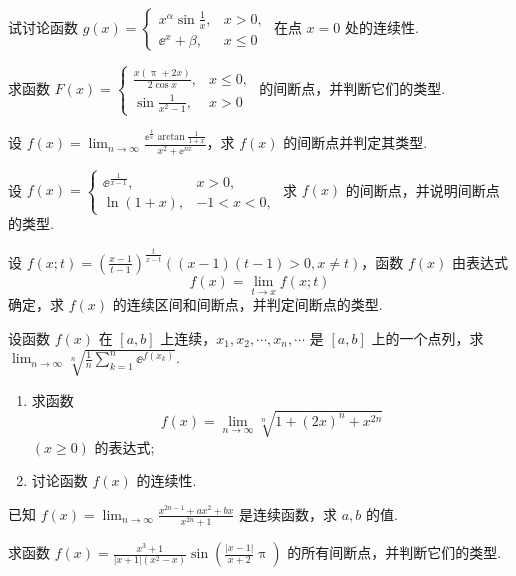 	\begin{ti}
		试讨论函数 $g(x) = \begin{cases}
			x^{\alpha} \sin\frac{1}{x}, & x > 0,\\
			\ee^{x} + \beta, & x \leq 0
		\end{cases}$ 在点 $x = 0$ 处的连续性.
	\end{ti}

	\begin{ti}
		求函数 $F(x) = \begin{cases}
			\frac{x(\uppi + 2x)}{2 \cos x}, & x \leq 0,\\
			\sin\frac{1}{x^{2} - 1}, & x > 0
		\end{cases}$ 的间断点，并判断它们的类型.
	\end{ti}

	\begin{ti}
		设 $f(x) = \lim_{n \to \infty}\frac{\ee^{\frac{1}{x}} \arctan\frac{1}{1 + x}}{x^{2} + \ee^{nx}}$，求 $f(x)$ 的间断点并判定其类型.
	\end{ti}

	\begin{ti}
		设 $f(x) = \begin{cases}
			\ee^{\frac{1}{x - 1}}, & x > 0,\\
			\ln(1 + x), & -1 < x < 0,
		\end{cases}$ 求 $f(x)$ 的间断点，并说明间断点的类型.
	\end{ti}

	\begin{ti}
		设 $f(x;t) = \left( \frac{x - 1}{t - 1} \right)^{\frac{t}{x - t}}((x - 1)(t - 1)>0, x \ne t)$，函数 $f(x)$ 由表达式
		\[
			f(x) = \lim_{t \to x}f(x;t)
		\]
		确定，求 $f(x)$ 的连续区间和间断点，并判定间断点的类型.
	\end{ti}

	\begin{ti}
		设函数 $f(x)$ 在 $[a,b]$ 上连续，$x_{1},x_{2},\cdots,x_{n},\cdots$ 是 $[a,b]$ 上的一个点列，求 $\lim_{n \to \infty} \sqrt[n]{\frac{1}{n}\sum_{k=1}^{n}\ee^{f(x_{k})}}$.
	\end{ti}

	\begin{ti}
		\begin{enumerate}
			\item 求函数 \[f(x) = \lim_{n \to \infty} \sqrt[n]{1 + (2x)^{n} + x^{2n}}\] $(x \geq 0)$ 的表达式;
			\item 讨论函数 $f(x)$ 的连续性.
		\end{enumerate}
	\end{ti}

	\begin{ti}
		已知 $f(x) = \lim_{n \to \infty} \frac{x^{2n-1} + ax^{2} + bx}{x^{2n} + 1}$ 是连续函数，求 $a,b$ 的值.
	\end{ti}

	\begin{ti}
		求函数 $f(x) = \frac{x^{3} + 1}{|x + 1|\left( x^{2} - x \right)} \sin\left( \frac{|x - 1|}{x + 2}\uppi \right)$ 的所有间断点，并判断它们的类型.
	\end{ti}